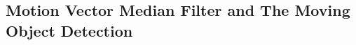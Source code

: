 \subsection{Motion Vector Median Filter and The Moving Object Detection}
\label{sub:filter}
\begin{figure}
\centering
{}
\end{figure}

